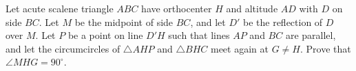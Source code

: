\begin{problem}
    Let acute scalene triangle $ABC$ have orthocenter $H$ and altitude $AD$ with $D$ on side $BC$. Let $M$ be the midpoint of side $BC$, and let $D'$ be the reflection of $D$ over $M$. Let $P$ be a point on line $D'H$ such that lines $AP$ and $BC$ are parallel, and let the circumcircles of $\triangle AHP$ and $\triangle BHC$ meet again at $G \neq H$. Prove that $\angle MHG = 90^\circ$.

    \label{20ELMO4}

\end{problem}
